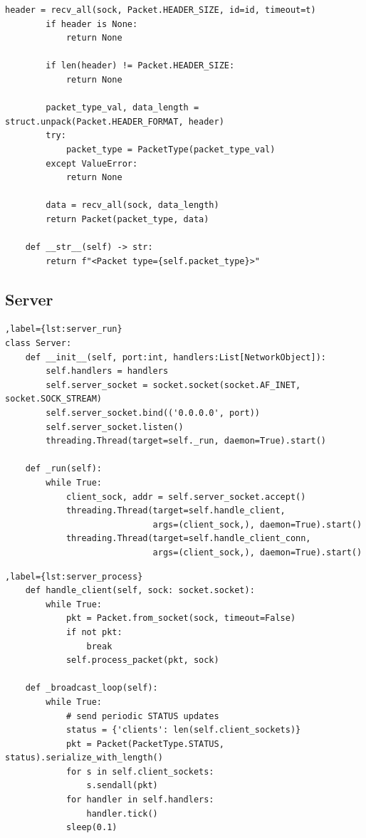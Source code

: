 \documentclass[11pt,a4paper]{article}
\begin{document}
\begin{lstlisting}[caption={\texttt{Packet} class and helper}]
        header = recv_all(sock, Packet.HEADER_SIZE, id=id, timeout=t)
        if header is None:
            return None

        if len(header) != Packet.HEADER_SIZE:
            return None

        packet_type_val, data_length = struct.unpack(Packet.HEADER_FORMAT, header)
        try:
            packet_type = PacketType(packet_type_val)
        except ValueError:
            return None

        data = recv_all(sock, data_length)
        return Packet(packet_type, data)

    def __str__(self) -> str:
        return f"<Packet type={self.packet_type}>"
\end{lstlisting}

\subsection{Server}
\begin{lstlisting}[caption={\texttt{Server} main loop}],label={lst:server_run}
class Server:
    def __init__(self, port:int, handlers:List[NetworkObject]):
        self.handlers = handlers
        self.server_socket = socket.socket(socket.AF_INET, socket.SOCK_STREAM)
        self.server_socket.bind(('0.0.0.0', port))
        self.server_socket.listen()
        threading.Thread(target=self._run, daemon=True).start()

    def _run(self):
        while True:
            client_sock, addr = self.server_socket.accept()
            threading.Thread(target=self.handle_client,
                             args=(client_sock,), daemon=True).start()
            threading.Thread(target=self.handle_client_conn,
                             args=(client_sock,), daemon=True).start()
\end{lstlisting}

\begin{lstlisting}[caption={Handling packets and broadcasting}],label={lst:server_process}
    def handle_client(self, sock: socket.socket):
        while True:
            pkt = Packet.from_socket(sock, timeout=False)
            if not pkt:
                break
            self.process_packet(pkt, sock)

    def _broadcast_loop(self):
        while True:
            # send periodic STATUS updates
            status = {'clients': len(self.client_sockets)}
            pkt = Packet(PacketType.STATUS, status).serialize_with_length()
            for s in self.client_sockets:
                s.sendall(pkt)
            for handler in self.handlers:
                handler.tick()
            sleep(0.1)
\end{lstlisting}
\end{document}
